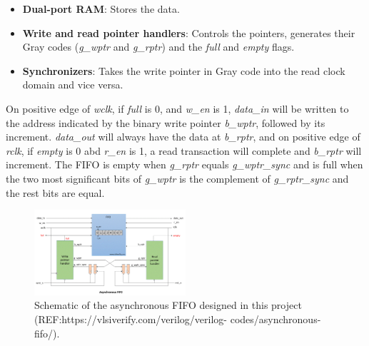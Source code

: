 \documentclass[conference]{IEEEtran}
\begin{document}
\begin{itemize}
    \item \textbf{Dual-port RAM}: Stores the data.
    \item \textbf{Write and read pointer handlers}: Controls the pointers, generates their Gray codes (\textit{g\_wptr} and \textit{g\_rptr}) and the \textit{full} and \textit{empty} flags.
    \item \textbf{Synchronizers}: Takes the write pointer in Gray code into the read clock domain and vice versa.
\end{itemize}

On positive edge of \textit{wclk}, if \textit{full} is 0, and \textit{w\_en} is 1, \textit{data\_in} will be written to the address indicated by the binary write pointer \textit{b\_wptr}, followed by its increment. \textit{data\_out} will always have the data at \textit{b\_rptr}, and on positive edge of \textit{rclk}, if \textit{empty} is 0 abd \textit{r\_en} is 1, a read transaction will complete and \textit{b\_rptr} will increment. The FIFO is empty when \textit{g\_rptr} equals \textit{g\_wptr\_sync} and is full when the two most significant
bits of \textit{g\_wptr} is the complement of \textit{g\_rptr\_sync} and the rest bits are equal.
 
\begin{figure}[h!]
    \centering
    \includegraphics[width = 0.5\textwidth]{figures/asynchronous-fifo.png}
    \caption{Schematic of the asynchronous FIFO designed
    in this project (REF:https://vlsiverify.com/verilog/verilog-
    codes/asynchronous-fifo/).}
    \label{fig:fifo}
\end{figure}
\end{document}

